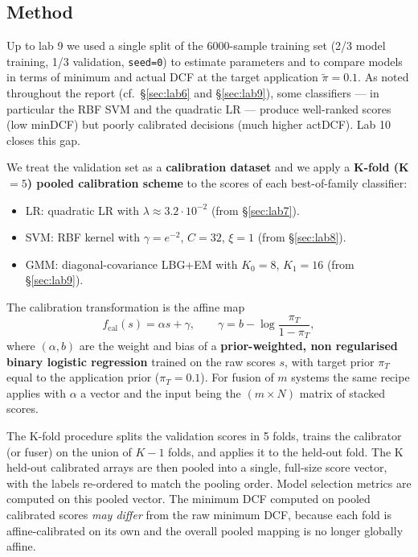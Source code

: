 \documentclass[11pt,a4paper]{article}
\begin{document}
\subsection{Method}

Up to lab 9 we used a single split of the 6000-sample training set
(2/3 model training, 1/3 validation, \texttt{seed=0}) to estimate
parameters and to compare models in terms of minimum and actual DCF
at the target application $\tilde{\pi}=0.1$. As noted throughout the
report (cf.\ \S\ref{sec:lab6} and \S\ref{sec:lab9}), some
classifiers --- in particular the RBF SVM and the quadratic LR ---
produce well-ranked scores (low minDCF) but poorly calibrated
decisions (much higher actDCF). Lab 10 closes this gap.

We treat the validation set as a \textbf{calibration dataset} and we
apply a \textbf{K-fold (K $=5$) pooled calibration scheme} to the
scores of each best-of-family classifier:
\begin{itemize}
\item LR: quadratic LR with $\lambda \approx 3.2\cdot 10^{-2}$ (from \S\ref{sec:lab7}).
\item SVM: RBF kernel with $\gamma = e^{-2}$, $C = 32$, $\xi = 1$ (from \S\ref{sec:lab8}).
\item GMM: diagonal-covariance LBG+EM with $K_0=8$, $K_1=16$ (from \S\ref{sec:lab9}).
\end{itemize}

The calibration transformation is the affine map
\[
f_{\text{cal}}(s) = \alpha s + \gamma ,
\qquad
\gamma = b - \log\frac{\pi_T}{1 - \pi_T},
\]
where $(\alpha, b)$ are the weight and bias of a \textbf{prior-weighted,
non regularised binary logistic regression} trained on the raw scores
$s$, with target prior $\pi_T$ equal to the application prior
($\pi_T = 0.1$). For fusion of $m$ systems the same recipe applies
with $\alpha$ a vector and the input being the $(m \times N)$ matrix
of stacked scores.

The K-fold procedure splits the validation scores in 5 folds, trains
the calibrator (or fuser) on the union of $K-1$ folds, and applies it
to the held-out fold. The K held-out calibrated arrays are then pooled
into a single, full-size score vector, with the labels re-ordered to
match the pooling order. Model selection metrics are computed on this
pooled vector. The minimum DCF computed on pooled calibrated scores
\emph{may differ} from the raw minimum DCF, because each fold is
affine-calibrated on its own and the overall pooled mapping is no
longer globally affine.
\end{document}
